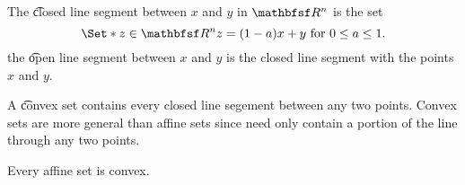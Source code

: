 
\sbasic































\sstart
{}




The \t{closed line segment} between $x$ and $y$ in $\R^n$ is the set
$$
  \Set*{z \in \R^n}{z = (1-a) x + y \text{ for } 0 \leq a \leq 1}.
$$
the \t{open line segment} between $x$ and $y$ is the closed line segment with the points $x$ and $y$.

A \t{convex set} contains every closed line segement between any two points.
Convex sets are more general than affine sets since need only contain a portion of the line through any two points.

\begin{prop}
  Every affine set is convex.
\end{prop}

